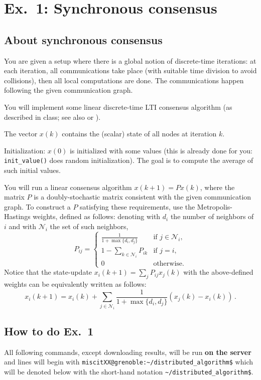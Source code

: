 \documentclass[oneside]{article}
\newcommand{\mc}{\mathcal}
\begin{document}
\section{Ex.~1: Synchronous consensus}

\subsection{About synchronous consensus}

You are given a setup where there is a global notion of discrete-time iterations:
at each iteration, all communications take place (with suitable time division to avoid collisions), then all local computations are done. The communications happen following the given communication graph.

You will implement some linear discrete-time LTI consensus algorithm (as described in class; see also \cite[Chapter~5]{bullo-book} or \cite{consensus-tutorial}).

The vector $x(k)$ contains the (scalar) state of all nodes at iteration $k$.

Initialization: $x(0)$ is initialized with some values (this is already done for you: \verb=init_value()= does random initialization). The goal is to compute the average of such initial values. 

You will run a linear consensus algorithm $x(k+1) = P x(k)$, where the matrix $P$ is a doubly-stochastic matrix consistent with the given communication graph. To construct a $P$ satisfying these requirements, use the Metropolis-Hastings weights, defined as follows:
denoting with $d_i$ the number of neighbors of $i$ and with $\mc N_i$ the set of such neighbors,
\[ P_{ij} =
\begin{cases}
\frac{1}{1+\max\{d_i, d_j \}} & \text{if $j \in \mc N_i$,}\\
1-\sum_{k \in \mc N_i} P_{ik} & \text{if $j = i$,}\\
0							  & \text{otherwise}.
\end{cases}
\]
Notice that the state-update $x_i(k+1) = \sum_j P_{ij} x_j(k)$ with the above-defined weights can be equivalently written as follows:
\[ x_i(k+1) = x_i(k) + \sum_{j \in \mc N_i} \frac{1}{1+\max\{d_i, d_j \}} (x_j(k) - x_i(k)) \,.\]



\subsection{How to do Ex.~1}
All following commands, except downloading results,  will be run \textbf{on the server} and lines will begin with
\verb=miscitXX@grenoble:~/distributed_algorithm$= 
which will be denoted below with the short-hand notation
\verb=~/distributed_algorithm$=.
\end{document}

